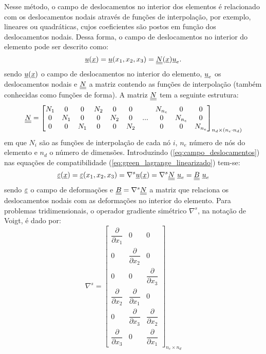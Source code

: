Nesse método, o campo de deslocamentos no interior dos elementos é relacionado com os deslocamentos nodais através de funções de interpolação, por exemplo, lineares ou quadráticas, cujos coeficientes são postos em função dos deslocamentos nodais. Dessa forma, o campo de deslocamentos no interior do elemento pode ser descrito como:
\begin{equation}
	\label{eq:campo_deslocamentos}
	\underline u(\underline x) = \underline u(x_1,x_2,x_3) = \underline{\underline N}(\underline x)\underline u_e.
\end{equation}
sendo $\underline u(\underline x)$ o campo de deslocamentos no interior do elemento, $\underline u_e$ os deslocamentos nodais e $\underline{\underline N}$ a matriz contendo as funções de interpolação (também conhecidas como funções de forma). A matriz $\underline{\underline N}$  tem a seguinte estrutura:
\begin{equation}
	\label{eq:matriz_N}
	\underline{\underline N} = 	\begin{bmatrix}
		N_1 & 0 & 0 & N_2 & 0 & 0 &  	& N_{n_e} & 0 & 0 \\
		0 & N_1 & 0 & 0 & N_2 & 0 & ... & 0 & N_{n_e} & 0  \\
		0 & 0 & N_1 & 0 & 0 & N_2 &  	& 0 & 0 & N_{n_e} 
	\end{bmatrix}_{n_d \times (n_e \cdot n_d)}
\end{equation}
em que $N_i$ são as funções de interpolação de cada nó $i$, $n_e$ número de nós do elemento e $n_d$ o número de dimensões. Introduzindo (\ref{eq:campo_deslocamentos}) nas equações de compatibilidade (\ref{eq:green_lagrange_linearizado}) tem-se:
\begin{equation}
	\label{eq:deformacoes}
	\underline{\varepsilon}(\underline x) = \underline{\varepsilon}(x_1,x_2,x_3) = \nabla^s\underline u(\underline x) = \nabla^s \underline{\underline N}~\underline u_e = \underline{\underline B}~\underline u_e
\end{equation}
sendo $\underline{\varepsilon}$ o campo de deformações e $\underline{\underline B} = \nabla^s \underline{\underline N}$ a matriz que relaciona os deslocamentos nodais com as deformações no interior do elemento. Para problemas tridimensionais, o operador gradiente simétrico $\nabla^s$, na notação de Voigt, é dado por:
\begin{equation}
	\label{eq:gradiente_simetrico}
	\nabla^s = 	\begin{bmatrix}
		\dfrac{\partial}{\partial x_1} & 0 & 0  \\
		0 & \dfrac{\partial}{\partial x_2} & 0  \\
		0 & 0 & \dfrac{\partial}{\partial x_3} \\
		\dfrac{\partial}{\partial x_2} & \dfrac{\partial}{\partial x_1} & 0 \\
		0 & \dfrac{\partial}{\partial x_3} & \dfrac{\partial}{\partial x_2} \\
		\dfrac{\partial}{\partial x_3} & 0 & \dfrac{\partial}{\partial x_1}		
	\end{bmatrix}_{n_c \times n_d}
\end{equation}
